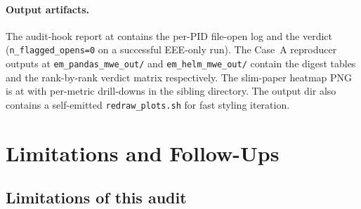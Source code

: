 \documentclass[11pt]{article}
\begin{document}
\paragraph{Output artifacts.}
The audit-hook report at
  contains the per-PID file-open log and the verdict
  (\texttt{n\_flagged\_opens=0} on a successful EEE-only run).
The Case~A reproducer outputs at
  \texttt{em\_pandas\_mwe\_out/} and \texttt{em\_helm\_mwe\_out/}
  contain the digest tables and the rank-by-rank verdict matrix
  respectively.
The slim-paper heatmap PNG is at
   with
  per-metric drill-downs in the sibling
   directory.
The output dir also contains a self-emitted
  \texttt{redraw\_plots.sh} for fast styling iteration.


\section{Limitations and Follow-Ups}
\label{sec:tr-limitations}

\subsection{Limitations of this audit}
\label{sec:tr-limitations-list}
\end{document}

